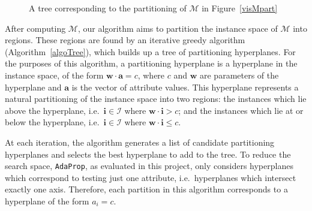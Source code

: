 \documentclass[a4paper,12pt]{report} %
\newcommand{\AdaProp}{\texttt{AdaProp}\xspace}
\newcommand{\mcl}[1]{\mathcal{#1}}
\newcommand{\vect}[1]{\boldsymbol{#1}}
\begin{document}
\begin{figure}[p]
\begin{center}
\iftoggle{dotikzext}{\tikzsetnextfilename{eg-data/tree}}{}
\end{center}
\caption{A tree corresponding to the partitioning of $\mcl{M}$ in Figure~\ref{visMpart}}
\label{visMTree}
\end{figure}

After computing $\mcl{M}$, 
    our algorithm
    aims to partition the instance space of $\mcl{M}$ into regions.
These regions are found by an iterative greedy algorithm (Algorithm~\ref{algoTree}), 
    which builds up a tree of partitioning hyperplanes.
For the purposes of this algorithm, 
    a partitioning hyperplane is a hyperplane in the instance space, 
    of the form $\vect{w} \cdot \vect{a} = c$,
    where $c$ and $\vect{w}$ are parameters of the hyperplane and 
    $\vect{a}$ is the vector of attribute values.
This hyperplane represents a natural partitioning of the instance space
    into two regions:
        the instances which lie above the hyperplane, 
            i.e.\ $\vect{i} \in \mcl{I}$ where $\vect{w} \cdot \vect{i} > c$; and
        the instances which lie at or below the hyperplane,
            i.e.\ $\vect{i} \in \mcl{I}$ where $\vect{w} \cdot \vect{i} \leq c$.
    
At each iteration,
    the algorithm generates a list of candidate partitioning hyperplanes and
    selects the best hyperplane to add to the tree.
To reduce the search space,
    \AdaProp, as evaluated in this project,
     only considers hyperplanes which
    correspond to testing just one attribute, 
    i.e.\ hyperplanes which intersect exactly one axis.
Therefore, each partition in this algorithm
    corresponds to a hyperplane of the form $a_i = c$.
\end{document}

